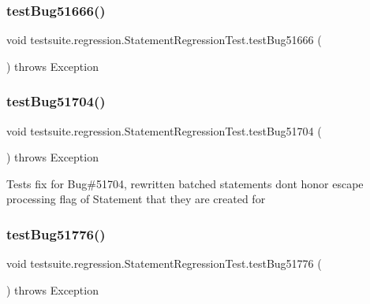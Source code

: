 \subsubsection{\texorpdfstring{test\+Bug51666()}{testBug51666()}}
{\footnotesize\ttfamily void testsuite.\+regression.\+Statement\+Regression\+Test.\+test\+Bug51666 (\begin{DoxyParamCaption}{ }\end{DoxyParamCaption}) throws Exception}

\mbox{\label{classtestsuite_1_1regression_1_1_statement_regression_test_ae340966f884a71e95d8ff3df860c27e6}} 
\subsubsection{\texorpdfstring{test\+Bug51704()}{testBug51704()}}
{\footnotesize\ttfamily void testsuite.\+regression.\+Statement\+Regression\+Test.\+test\+Bug51704 (\begin{DoxyParamCaption}{ }\end{DoxyParamCaption}) throws Exception}

Tests fix for Bug\#51704, rewritten batched statements don\textquotesingle{}t honor escape processing flag of Statement that they are created for \mbox{\label{classtestsuite_1_1regression_1_1_statement_regression_test_a53b1501aa3242f209e129d5301ff41e3}} 
\subsubsection{\texorpdfstring{test\+Bug51776()}{testBug51776()}}
{\footnotesize\ttfamily void testsuite.\+regression.\+Statement\+Regression\+Test.\+test\+Bug51776 (\begin{DoxyParamCaption}{ }\end{DoxyParamCaption}) throws Exception}

